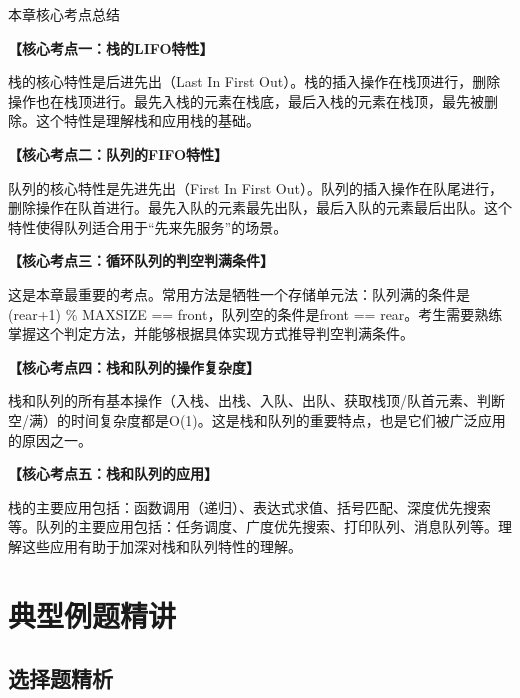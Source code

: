\documentclass[12pt, a4paper]{article}
\newenvironment{bluebox}{\begin{framed}\begin{minipage}{\linewidth}}{\end{minipage}\end{framed}}
\begin{document}
\begin{bluebox}{本章核心考点总结}

	\textbf{【核心考点一：栈的LIFO特性】}

	栈的核心特性是后进先出（Last In First Out）。栈的插入操作在栈顶进行，删除操作也在栈顶进行。最先入栈的元素在栈底，最后入栈的元素在栈顶，最先被删除。这个特性是理解栈和应用栈的基础。

	\textbf{【核心考点二：队列的FIFO特性】}

	队列的核心特性是先进先出（First In First Out）。队列的插入操作在队尾进行，删除操作在队首进行。最先入队的元素最先出队，最后入队的元素最后出队。这个特性使得队列适合用于“先来先服务”的场景。

	\textbf{【核心考点三：循环队列的判空判满条件】}

	这是本章最重要的考点。常用方法是牺牲一个存储单元法：队列满的条件是(rear+1) \% MAXSIZE == front，队列空的条件是front == rear。考生需要熟练掌握这个判定方法，并能够根据具体实现方式推导判空判满条件。

	\textbf{【核心考点四：栈和队列的操作复杂度】}

	栈和队列的所有基本操作（入栈、出栈、入队、出队、获取栈顶/队首元素、判断空/满）的时间复杂度都是O(1)。这是栈和队列的重要特点，也是它们被广泛应用的原因之一。

	\textbf{【核心考点五：栈和队列的应用】}

	栈的主要应用包括：函数调用（递归）、表达式求值、括号匹配、深度优先搜索等。队列的主要应用包括：任务调度、广度优先搜索、打印队列、消息队列等。理解这些应用有助于加深对栈和队列特性的理解。
\end{bluebox}

\section{典型例题精讲}

\subsection{选择题精析}
\end{document}
